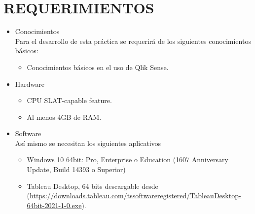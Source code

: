 \documentclass[12pt,letterpaper]{article}
\begin{document}
    \section{REQUERIMIENTOS}
    \begin{itemize}
        \item Conocimientos\\
        Para el desarrollo de esta práctica se requerirá de los siguientes conocimientos básicos:
        \begin{itemize} 
            \item Conocimientos básicos en el uso de Qlik Sense.
        \end{itemize}
        \item Hardware
        \begin{itemize}
            \item CPU SLAT-capable feature.
            \item Al menos 4GB de RAM.
        \end{itemize}
        \item Software\\
        Así mismo se necesitan los siguientes aplicativos
        \begin{itemize}
            \item Windows 10 64bit: Pro, Enterprise o Education (1607 Anniversary Update, Build 14393 o Superior) 
            \item Tableau Desktop, 64 bits descargable desde (\textcolor{azul}{\url{https://downloads.tableau.com/tssoftwareregistered/TableauDesktop-64bit-2021-1-0.exe}}).
        \end{itemize}
    \end{itemize}
\end{document}

